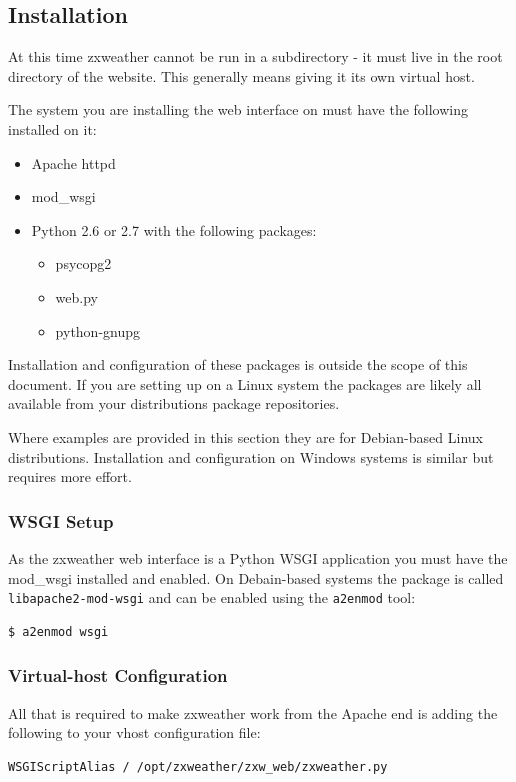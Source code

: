 \documentclass[a4paper,10pt,draft]{book}
\begin{document}
\subsection{Installation}

At this time zxweather cannot be run in a subdirectory - it must live in the root directory of the website. This generally means giving it its own virtual host.

The system you are installing the web interface on must have the following installed on it:
\begin{itemize}
\item Apache httpd
\item mod\_wsgi
\item Python 2.6 or 2.7 with the following packages:
\begin{itemize}
\item psycopg2
\item web.py
\item python-gnupg
\end{itemize}
\end{itemize}

Installation and configuration of these packages is outside the scope of this document. If you are setting up on a Linux system the packages are likely all available from your distributions package repositories. 

Where examples are provided in this section they are for Debian-based Linux distributions. Installation and configuration on Windows systems is similar but requires more effort.

\subsubsection{WSGI Setup}
As the zxweather web interface is a Python WSGI application you must have the mod\_wsgi installed and enabled. On Debain-based systems the package is called \verb|libapache2-mod-wsgi| and can be enabled using the \verb|a2enmod| tool:

\begin{verbatim}
$ a2enmod wsgi
\end{verbatim}

\subsubsection{Virtual-host Configuration}

All that is required to make zxweather work from the Apache end is adding the following to your vhost configuration file:
\begin{verbatim}
WSGIScriptAlias / /opt/zxweather/zxw_web/zxweather.py
\end{verbatim}
\end{document}
